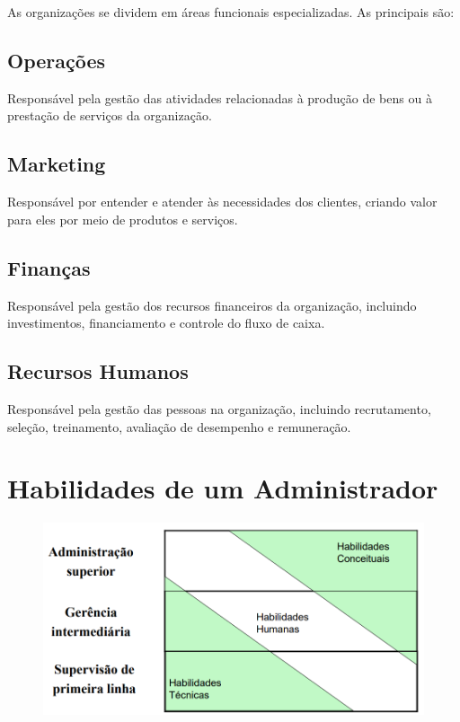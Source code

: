 As organizações se dividem em áreas funcionais especializadas. As principais são:

\subsection{Operações}
Responsável pela gestão das atividades relacionadas à produção de bens ou à prestação de serviços da organização.

\subsection{Marketing}
Responsável por entender e atender às necessidades dos clientes, criando valor para eles por meio de produtos e serviços.

\subsection{Finanças}
Responsável pela gestão dos recursos financeiros da organização, incluindo investimentos, financiamento e controle do fluxo de caixa.

\subsection{Recursos Humanos}
Responsável pela gestão das pessoas na organização, incluindo recrutamento, seleção, treinamento, avaliação de desempenho e remuneração.

\section{Habilidades de um Administrador}

\begin{figure}[H]  %
    \centering
    \begin{minipage}{0.6\textwidth}
        \centering
        \includegraphics[width=\textwidth]{img/imagem8.png}
        
        \label{fig:exemplo}
    \end{minipage}
\end{figure}

